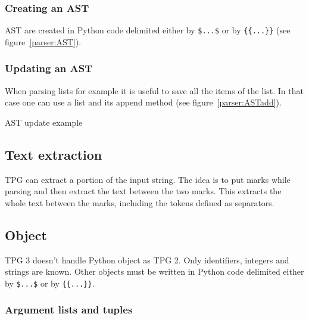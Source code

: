\subsubsection{Creating an AST}

AST are created in Python code delimited either by \verb!$...$! or by \verb!{{...}}! (see figure~\ref{parser:AST}).

\subsubsection{Updating an AST}

When parsing lists for example it is useful to save all the items of the list.
In that case one can use a list and its append method (see figure~\ref{parser:ASTadd}).

\begin{code}
\caption{AST update example}									\label{parser:ASTadd}
\end{code}

\subsection{Text extraction}									\label{parser:mark}

TPG can extract a portion of the input string.
The idea is to put marks while parsing and then extract the text between the two marks.
This extracts the whole text between the marks, including the tokens defined as separators.

\subsection{Object}												\label{parser:object}

TPG 3 doesn't handle Python object as TPG 2.
Only identifiers, integers and strings are known.
Other objects must be written in Python code delimited either by \verb!$...$! or by \verb!{{...}}!.

\subsubsection{Argument lists and tuples}

